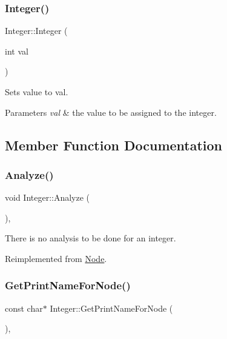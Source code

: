 \subsubsection{\texorpdfstring{Integer()}{Integer()}}
{\footnotesize\ttfamily Integer\+::\+Integer (\begin{DoxyParamCaption}\item[{int}]{val }\end{DoxyParamCaption})}

Set\textquotesingle{}s value to val. 
\begin{DoxyParams}{Parameters}
{\em val} & the value to be assigned to the integer. \\
\hline
\end{DoxyParams}


\subsection{Member Function Documentation}
\mbox{\label{class_integer_ac3ffa2f3f2d9feaed58bbb2a5d8f1c59}} 
\subsubsection{\texorpdfstring{Analyze()}{Analyze()}}
{\footnotesize\ttfamily void Integer\+::\+Analyze (\begin{DoxyParamCaption}{ }\end{DoxyParamCaption})\hspace{0.3cm}{\ttfamily [inline]}, {\ttfamily [virtual]}}

There is no analysis to be done for an integer. 

Reimplemented from \hyperlink{class_node_a5f88d55c6f253a29def7ccc443d83d47}{Node}.

\mbox{\label{class_integer_ab4a1c2619f03557638a6740419337b82}} 
\subsubsection{\texorpdfstring{Get\+Print\+Name\+For\+Node()}{GetPrintNameForNode()}}
{\footnotesize\ttfamily const char$\ast$ Integer\+::\+Get\+Print\+Name\+For\+Node (\begin{DoxyParamCaption}{ }\end{DoxyParamCaption})\hspace{0.3cm}{\ttfamily [inline]}, {\ttfamily [virtual]}}


